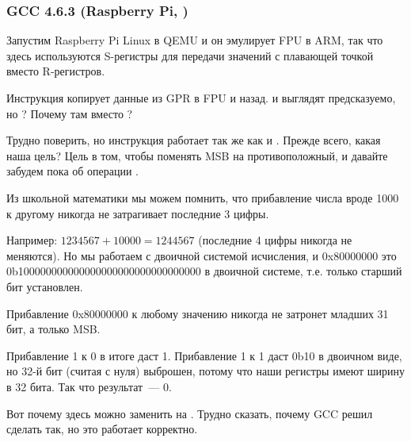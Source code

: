 \subsubsection{\Optimizing GCC 4.6.3 (Raspberry Pi, \ARMMode)}



Запустим Raspberry Pi Linux в QEMU и он эмулирует FPU в ARM, так что здесь используются S-регистры
для передачи значений с плавающей точкой вместо R-регистров.

Инструкция \FMRS копирует данные из \ac{GPR} в FPU и назад.
 и  выглядят предсказуемо, но ?
Почему там \ADD вместо \XOR?

Трудно поверить, но инструкция 
 работает так же как и .
Прежде всего, какая наша цель?
Цель в том, чтобы поменять \ac{MSB} на противоположный, и давайте забудем пока об операции \XOR.

Из школьной математики мы можем помнить, что прибавление числа вроде 1000 к другому никогда не затрагивает последние 3 цифры.

Например: $1234567 + 10000 = 1244567$ (последние 4 цифры никогда не меняются).
Но мы работаем с двоичной системой исчисления, и 0x80000000 это 0b100000000000000000000000000000000
в двоичной системе, т.е. только старший бит установлен.

Прибавление 0x80000000 к любому значению никогда не затронет младших 31 бит, а только \ac{MSB}.

Прибавление 1 к 0 в итоге даст 1.
Прибавление 1 к 1 даст 0b10 в двоичном виде, но 32-й бит (считая с нуля) выброшен, 
потому что наши регистры имеют ширину в 32 бита. Так что результат~--- 0.

Вот почему \XOR здесь можно заменить на \ADD.
Трудно сказать, почему GCC решил сделать так, но это работает корректно.%

